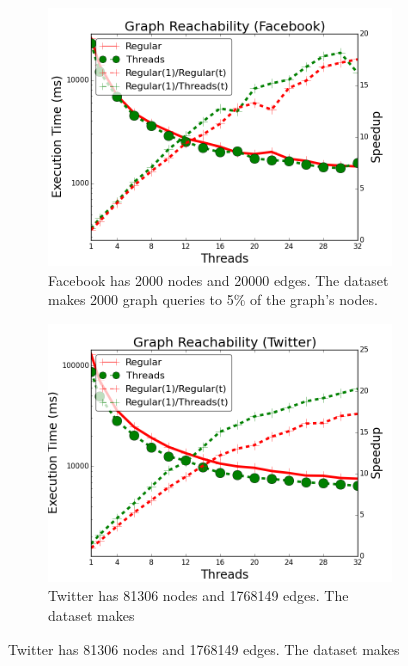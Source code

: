 \begin{figure}[]
        \centering
        \begin{subfigure}[b]{\plotsize\textwidth}
           \includegraphics[width=\textwidth]{experiments/threads/cmp-search-facebook.png}
           \caption{Facebook has 2000 nodes and 20000 edges. The dataset makes
           2000 graph queries to 5\% of the graph's nodes.}
           \label{fig:threads:search_facebook}
        \end{subfigure}
        \spacing
        \begin{subfigure}[b]{\plotsize\textwidth}
           \includegraphics[width=\textwidth]{experiments/threads/cmp-search-twitter.png}
           \caption{Twitter has 81306 nodes and 1768149 edges. The dataset makes
}
\end{subfigure}
\end{figure}
